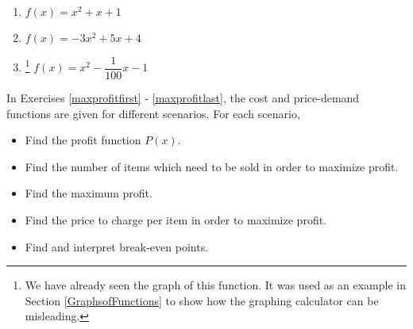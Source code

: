 \begin{multicols}{3}
\begin{enumerate}
\setcounter{enumi}{\value{HW}}

\item  $f(x) = x^2 + x + 1$

\item  $f(x) = -3x^2+5x+4$

\item \hspace{-0.15in} \footnote{We have already seen the graph of this function.  It was used as an example in Section \ref{GraphsofFunctions} to show how the graphing calculator can be misleading.}
 $f(x) = x^{2} - \dfrac{1}{100} x - 1$ \label{graphquadfunclast}

\setcounter{HW}{\value{enumi}}
\end{enumerate}
\end{multicols}

In Exercises \ref{maxprofitfirst} - \ref{maxprofitlast}, the cost and price-demand functions are given for different scenarios.  For each scenario,


\begin{itemize}

\item  Find the profit function $P(x)$.

\item  Find the number of items which need to be sold in order to maximize profit.

\item  Find the maximum profit.

\item  Find the price to charge per item in order to maximize profit.

\item  Find and interpret break-even points.

\end{itemize}


